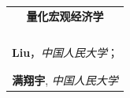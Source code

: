 
\thispagestyle{empty}
\vspace*{\fill}

\begin{center}
    \begin{tabular}{c}
        \textbf{量化宏观经济学} \\
        \\\\\\\\
        \textbf{Liu}，\textit{中国人民大学}；\\
        \\\\
        \textbf{满翔宇}, \textit{中国人民大学}
    \end{tabular}
\end{center}
\vspace*{\fill}